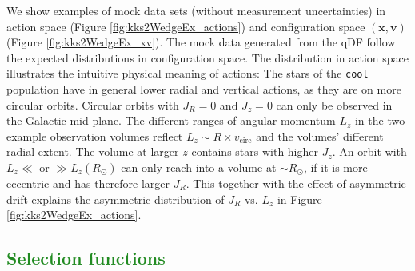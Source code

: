 \documentclass[iop,revtex4]{emulateapj}
\newcommand{\vect}[1]{\boldsymbol{#1}}
\newcommand{\NEW}[1]{\textcolor{ForestGreen}{#1}}
\begin{document}
\begin{appendix}
We show examples of mock data sets (without measurement uncertainties) in action space (Figure \ref{fig:kks2WedgeEx_actions}) and configuration space $(\vect{x},\vect{v})$ (Figure \ref{fig:kks2WedgeEx_xv}). The mock data generated from the qDF follow the expected distributions in configuration space. The distribution in action space illustrates the intuitive physical meaning of actions: The stars of the \texttt{cool} population have in general lower radial and vertical actions, as they are on more circular orbits. Circular orbits with $J_R = 0$ and $J_z = 0$ can only be observed in the Galactic mid-plane. The different ranges of angular momentum $L_z$ in the two example observation volumes reflect $L_z \sim R  \times v_\text{circ}$ and the volumes' different radial extent. The volume at larger $z$ contains stars with higher $J_z$.  An orbit with $L_z \ll$ or $\gg L_z(R_\odot)$ can only reach into a volume at $\sim R_\odot$, if it is more eccentric and has therefore larger $J_R$. This together with the effect of asymmetric drift explains the asymmetric distribution of $J_R$ vs. $L_z$ in Figure \ref{fig:kks2WedgeEx_actions}.

\subsection{\NEW{Selection functions}} \label{app:selectionfunction}%


\end{appendix}
\end{document}
